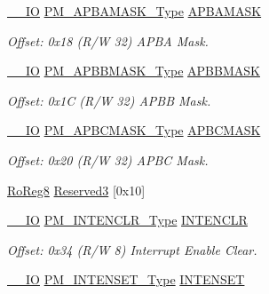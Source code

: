 \begin{DoxyCompactItemize}
\mbox{\hyperlink{core__cm0plus_8h_aec43007d9998a0a0e01faede4133d6be}{\+\_\+\+\_\+\+IO}} \mbox{\hyperlink{union_p_m___a_p_b_a_m_a_s_k___type}{P\+M\+\_\+\+A\+P\+B\+A\+M\+A\+S\+K\+\_\+\+Type}} \mbox{\hyperlink{struct_pm_a468bceadd4f6d2169b62a05a172a8844}{A\+P\+B\+A\+M\+A\+SK}}
\begin{DoxyCompactList}\small\item\em Offset\+: 0x18 (R/W 32) A\+P\+BA Mask. \end{DoxyCompactList}\item 
\mbox{\hyperlink{core__cm0plus_8h_aec43007d9998a0a0e01faede4133d6be}{\+\_\+\+\_\+\+IO}} \mbox{\hyperlink{union_p_m___a_p_b_b_m_a_s_k___type}{P\+M\+\_\+\+A\+P\+B\+B\+M\+A\+S\+K\+\_\+\+Type}} \mbox{\hyperlink{struct_pm_afacc529beb39c2f6835bcf232c97f4ed}{A\+P\+B\+B\+M\+A\+SK}}
\begin{DoxyCompactList}\small\item\em Offset\+: 0x1C (R/W 32) A\+P\+BB Mask. \end{DoxyCompactList}\item 
\mbox{\hyperlink{core__cm0plus_8h_aec43007d9998a0a0e01faede4133d6be}{\+\_\+\+\_\+\+IO}} \mbox{\hyperlink{union_p_m___a_p_b_c_m_a_s_k___type}{P\+M\+\_\+\+A\+P\+B\+C\+M\+A\+S\+K\+\_\+\+Type}} \mbox{\hyperlink{struct_pm_a78c069be496a3aead109a49b29c3d48b}{A\+P\+B\+C\+M\+A\+SK}}
\begin{DoxyCompactList}\small\item\em Offset\+: 0x20 (R/W 32) A\+P\+BC Mask. \end{DoxyCompactList}\item 
\mbox{\hyperlink{group___s_a_m_d21_e15_a__definitions_ga0d957f1433aaf5d70e4dc2b68288442d}{Ro\+Reg8}} \mbox{\hyperlink{struct_pm_a44e860edf7097c37fa2451e4884054eb}{Reserved3}} \mbox{[}0x10\mbox{]}
\item 
\mbox{\hyperlink{core__cm0plus_8h_aec43007d9998a0a0e01faede4133d6be}{\+\_\+\+\_\+\+IO}} \mbox{\hyperlink{union_p_m___i_n_t_e_n_c_l_r___type}{P\+M\+\_\+\+I\+N\+T\+E\+N\+C\+L\+R\+\_\+\+Type}} \mbox{\hyperlink{struct_pm_a4093e8f9e7882b6f1fde78af8842f3d1}{I\+N\+T\+E\+N\+C\+LR}}
\begin{DoxyCompactList}\small\item\em Offset\+: 0x34 (R/W 8) Interrupt Enable Clear. \end{DoxyCompactList}\item 
\mbox{\hyperlink{core__cm0plus_8h_aec43007d9998a0a0e01faede4133d6be}{\+\_\+\+\_\+\+IO}} \mbox{\hyperlink{union_p_m___i_n_t_e_n_s_e_t___type}{P\+M\+\_\+\+I\+N\+T\+E\+N\+S\+E\+T\+\_\+\+Type}} \mbox{\hyperlink{struct_pm_a9030958ab507497c2d8a0b97e18ba7cf}{I\+N\+T\+E\+N\+S\+ET}}

\end{DoxyCompactItemize}
